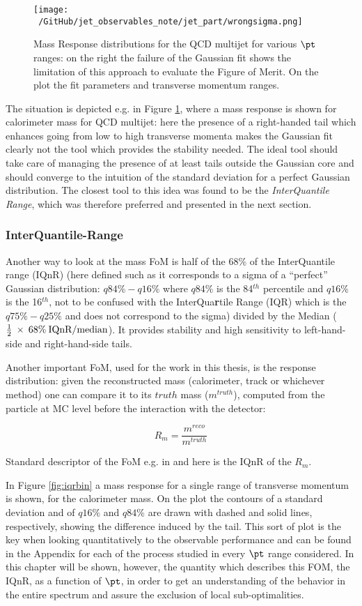 \begin{figure}[!ht]
  \centering
      \texttt{[image: ~/GitHub/jet\_observables\_note/jet\_part/wrongsigma.png]}
  \caption[Gaussian fit for QCD multijet]{Mass Response distributions for the QCD multijet for various $\pt$ ranges: on the right the failure of the Gaussian fit shows the limitation of this approach to evaluate the Figure of Merit. On the plot the fit parameters and transverse momentum ranges.}
  \label{fig:wrongsigma32}
\end{figure}

The situation is depicted e.g. in Figure \ref{fig:wrongsigma32}, where a mass response is shown for calorimeter mass for QCD multijet: here the presence of a right-handed tail which enhances going from low to high transverse momenta makes the Gaussian fit clearly not the tool which provides the stability needed. The ideal tool should take care of managing the presence of at least tails outside the Gaussian core and should converge to the intuition of the standard deviation for a perfect Gaussian distribution.
The closest tool to this idea was found to be the \textit{InterQuantile Range}, which was therefore preferred and presented in the next section.

\subsubsection{InterQuantile-Range}
Another way to look at the mass FoM is half of the 68\% of the InterQuantile range (IQnR) (here defined such as it corresponds to a sigma of a ``perfect'' Gaussian distribution: $q84\%-q16\%$ where $q84\%$ is the 84$^{th}$ percentile and $q16\%$ is the 16$^{th}$, not to be confused with the InterQua\textbf{r}tile Range (IQR) which is the $q75\%-q25\%$ and does not correspond to the sigma) divided by the Median ($\frac{1}{2}\: \times\: 68\% \:\textrm{IQnR/median}$). It provides stability and high sensitivity to left-hand-side and right-hand-side tails.

Another important FoM, used for the work in this thesis, is the response distribution: given the reconstructed mass (calorimeter, track or whichever method) one can compare it to its $truth$ mass ($m^{truth}$), computed from the particle at MC level before the interaction with the detector:

$$R_m=\frac{m^{reco}}{m^{truth}}$$

Standard descriptor of the FoM e.g. in \cite{art35} and here is the IQnR of the $R_m$.
  
  
In Figure \ref{fig:iqrbin} a mass response for a single range of transverse momentum is shown, for the calorimeter mass. On the plot the contours of a standard deviation and of $q16\%$ and $q84\%$ are drawn with dashed and solid lines, respectively, showing the difference induced by the tail. This sort of plot is the key when looking quantitatively to the observable performance and can be found in the Appendix for each of the process studied in every $\pt$ range considered. In this chapter will be shown, however, the quantity which describes this FOM, the IQnR, as a function of $\pt$, in order to get an understanding of the behavior in the entire spectrum and assure the exclusion of local sub-optimalities.

